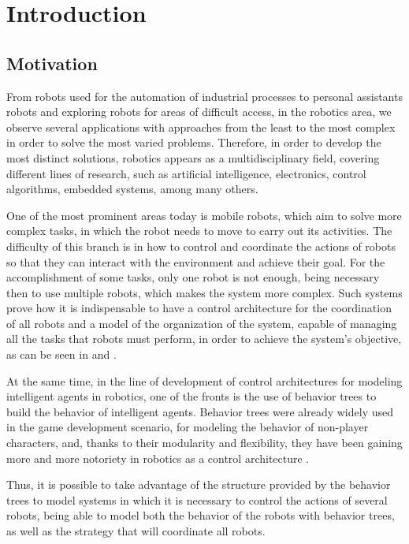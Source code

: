 \chapter{Introduction}

\section{Motivation}

From robots used for the automation of industrial processes to personal assistants robots and exploring robots for areas of difficult access, in the robotics area, we observe several applications with approaches from the least to the most complex in order to solve the most varied problems. Therefore, in order to develop the most distinct solutions, robotics appears as a multidisciplinary field, covering different lines of research, such as artificial intelligence, electronics, control algorithms, embedded systems, among many others.

One of the most prominent areas today is mobile robots, which aim to solve more complex tasks, in which the robot needs to move to carry out its activities. The difficulty of this branch is in how to control and coordinate the actions of robots so that they can interact with the environment and achieve their goal. For the accomplishment of some tasks, only one robot is not enough, being necessary then to use multiple robots, which makes the system more complex. Such systems prove how it is indispensable to have a control architecture for the coordination of all robots and a model of the organization of the system, capable of managing all the tasks that robots must perform, in order to achieve the system's objective, as can be seen in \cite{ACMultiplosRobos} and \cite{Moise}.

At the same time, in the line of development of control architectures for modeling intelligent agents in robotics, one of the fronts is the use of behavior trees to build the behavior of intelligent agents. Behavior trees were already widely used in the game development scenario, for modeling the behavior of non-player characters, and, thanks to their modularity and flexibility, they have been gaining more and more notoriety in robotics as a control architecture \cite{BTsInRobotics}.

Thus, it is possible to take advantage of the structure provided by the behavior trees to model systems in which it is necessary to control the actions of several robots, being able to model both the behavior of the robots with behavior trees, as well as the strategy that will coordinate all robots.

